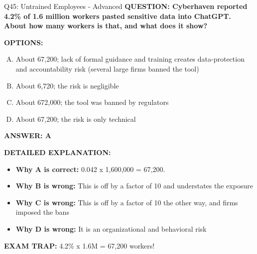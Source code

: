 \documentclass[8pt]{beamer}
\begin{document}
\begin{frame}[shrink=6]{Q45: Untrained Employees - Advanced}
\fontsize{6.5}{7.5}\selectfont
\textbf{QUESTION: Cyberhaven reported 4.2\% of 1.6 million workers pasted sensitive data into ChatGPT. About how many workers is that, and what does it show?}

\vspace{0.1cm}
\textbf{OPTIONS:}
\begin{enumerate}[A.]
\item About 67,200; lack of formal guidance and training creates data-protection and accountability risk (several large firms banned the tool)
\item About 6,720; the risk is negligible
\item About 672,000; the tool was banned by regulators
\item About 67,200; the risk is only technical
\end{enumerate}

\vspace{0.1cm}
\textcolor{myblue}{\textbf{ANSWER: A}}

\vspace{0.1cm}
\textbf{DETAILED EXPLANATION:}
\begin{itemize}
\item \textbf{Why A is correct:} 0.042 x 1,600,000 = 67,200.
\item \textbf{Why B is wrong:} This is off by a factor of 10 and understates the exposure
\item \textbf{Why C is wrong:} This is off by a factor of 10 the other way, and firms imposed the bans
\item \textbf{Why D is wrong:} It is an organizational and behavioral risk
\end{itemize}

\textcolor{myred}{\textbf{EXAM TRAP:}} 4.2\% x 1.6M = 67,200 workers!
\end{frame}
\end{document}
